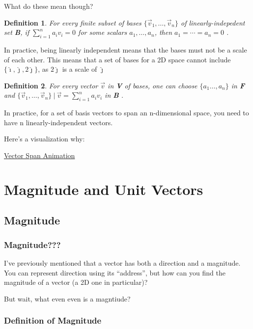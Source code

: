 \documentclass[12pt]{article}
\newtheorem{definition}{Definition}
\begin{document}
What do these mean though?

\begin{definition}
    For every finite subset of bases $\{\vec{v}_1, \ldots, \vec{v}_n \}$ of linearly-indepedent set \textbf{B}, if $\sum_{i=1}^{n} {a_i}{v_i} = 0$ for some scalars $a_1, \ldots, a_n$, then $a_1 = \cdots = a_n = 0$ \textup{\cite{enwiki:1373603812}}.
\end{definition}

In practice, being linearly independent means that the bases must not be a scale of each other. This means that a set of bases for a 2D space cannot include $\{\hat{\imath}, \hat{\jmath}, 2\hat{\jmath}\}$, as $2\hat{\jmath}$ is a scale of $\hat{\jmath}$

\begin{definition}
    For every vector $\vec{v}$ in \textbf{V} of bases, one can choose $\{a_{1} \ldots ,a_{n}\}$ in \textbf{F} and $\{\vec{v}_1, \ldots, \vec{v}_n \} \ | \ \vec{v} = \sum_{i=1}^{n}{a_i}{v _i}$ in \textbf{B} \textup{\cite{enwiki:1373603812}}.
\end{definition}

In practice, for a set of basis vectors to span an n-dimensional space, you need to have n linearly-independent vectors.

Here's a visualization why:

\href{https://www.dropbox.com/scl/fi/91rnwarpjem9i398tlmlo/VectorScene.mp4}{Vector Span Animation}

\section{Magnitude and Unit Vectors}

\subsection{Magnitude}

\subsubsection{Magnitude???}

I've previously mentioned that a vector has both a direction and a magnitude. You can represent direction using its ``address'', but how can you find the magnitude of a vector (a 2D one in particular)?

But wait, what even even is a magntiude?

\subsubsection{Definition of Magnitude}
\end{document}
